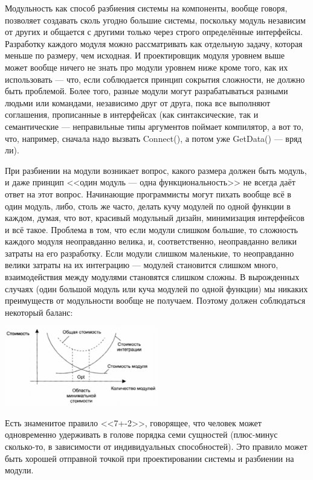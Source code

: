 \documentclass{../text-style}
\begin{document}
Модульность как способ разбиения системы на компоненты, вообще говоря, позволяет создавать сколь угодно большие системы, поскольку модуль независим от других и общается с другими только через строго определённые интерфейсы. Разработку каждого модуля можно рассматривать как отдельную задачу, которая меньше по размеру, чем исходная. И проектировщик модуля уровнем выше может вообще ничего не знать про модули уровнем ниже кроме того, как их использовать --- что, если соблюдается принцип сокрытия сложности, не должно быть проблемой. Более того, разные модули могут разрабатываться разными людьми или командами, независимо друг от друга, пока все выполняют соглашения, прописанные в интерфейсах (как синтаксические, так и семантические --- неправильные типы аргументов поймает компилятор, а вот то, что, например, сначала надо вызвать Connect(), а потом уже GetData() --- вряд ли).

При разбиении на модули возникает вопрос, какого размера должен быть модуль, и даже принцип <<один модуль --- одна функциональность>> не всегда даёт ответ на этот вопрос. Начинающие программисты могут пихать вообще всё в один модуль, либо, столь же часто, делать кучу модулей по одной функции в каждом, думая, что вот, красивый модульный дизайн, минимизация интерфейсов и всё такое. Проблема в том, что если модули слишком большие, то сложность каждого модуля неоправданно велика, и, соответственно, неоправданно велики затраты на его разработку. Если модули слишком маленькие, то неоправданно велики затраты на их интеграцию --- модулей становится слишком много, взаимодействия между модулями становятся слишком сложны. В вырожденных случаях (один большой модуль или куча модулей по одной функции) мы никаких преимуществ от модульности вообще не получаем. Поэтому должен соблюдаться некоторый баланс:

\begin{center}
    \includegraphics[width=0.5\textwidth]{modulesCost.png}
\end{center}

Есть знаменитое правило <<7+-2>>, говорящее, что человек может одновременно удерживать в голове порядка семи сущностей (плюс-минус сколько-то, в зависимости от индивидуальных способностей). Это правило может быть хорошей отправной точкой при проектировании системы и разбиении на модули.
\end{document}
